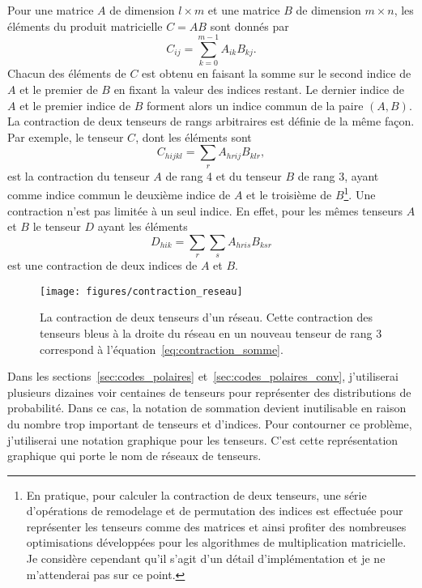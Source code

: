 Pour une matrice $A$ de dimension $l \times m$ et une matrice $B$ de dimension $m \times n$,
les éléments du produit matricielle $C = AB$ sont donnés par
\begin{equation}
  C_{ij} = \sum_{k=0}^{m - 1} A_{ik} B_{kj}.
\end{equation}
Chacun des éléments de $C$ est obtenu en faisant 
la somme sur le second indice de $A$ et le premier de $B$ 
en fixant la valeur des indices restant.
Le dernier indice de $A$ et le premier indice de $B$ forment 
alors un indice commun de la paire $(A, B)$.
La contraction de deux tenseurs de rangs arbitraires est définie 
de la même façon.
Par exemple, 
le tenseur $C$, dont les éléments sont
\begin{equation}
  C_{hijkl} = \sum_{r} A_{hrij} B_{klr},
\end{equation}
est la contraction du tenseur $A$ de rang 4
et du tenseur $B$ de rang 3, 
ayant comme indice commun
le deuxième indice de $A$ et le troisième de $B$\footnote{
En pratique, pour calculer la contraction de deux tenseurs, 
une série d'opérations de remodelage et de permutation des indices 
est effectuée pour représenter les tenseurs comme des matrices et 
ainsi profiter des nombreuses optimisations développées pour les algorithmes
de multiplication matricielle.
Je considère cependant qu'il s'agit d'un détail d'implémentation 
et je ne m'attenderai pas sur ce point.}.
Une contraction n'est pas limitée à un seul indice.
En effet,
pour les mêmes tenseurs $A$ et $B$ le tenseur $D$ ayant les éléments
\begin{equation}
  D_{hik} = \sum_{r} \sum_{s} A_{hris} B_{ksr}
  \label{eq:contraction_somme}
\end{equation}
est une contraction de deux indices de $A$ et $B$.

\begin{figure}[t]
  \begin{center}
    \texttt{[image: figures/contraction\_reseau]}
  \end{center}
  \caption{
    La contraction de deux tenseurs d'un réseau.
    Cette contraction des tenseurs bleus à la droite du réseau
    en un nouveau tenseur de rang 3 correspond à l'équation~\eqref{eq:contraction_somme}.
  }
  \label{fig:contraction_reseau}
\end{figure}

Dans les sections~\ref{sec:codes_polaires} et~\ref{sec:codes_polaires_conv},
j'utiliserai plusieurs dizaines voir centaines de tenseurs pour 
représenter des distributions de probabilité.
Dans ce cas, 
la notation de sommation devient inutilisable 
en raison du nombre trop important de tenseurs et d'indices.
Pour contourner ce problème,
j'utiliserai une notation graphique pour les tenseurs.
C'est cette représentation graphique qui porte le nom de réseaux de tenseurs.

